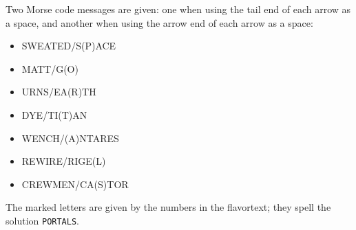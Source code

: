 Two Morse code messages are given: one when using the tail end of each
arrow as a space, and another when using the arrow end of each arrow
as a space:

\begin{itemize}
\item SWEATED/S(P)ACE
\item MATT/G(O)
\item URNS/EA(R)TH
\item DYE/TI(T)AN
\item WENCH/(A)NTARES
\item REWIRE/RIGE(L)
\item CREWMEN/CA(S)TOR  
\end{itemize}

The marked letters are given by the numbers in the flavortext;
they spell the solution \texttt{PORTALS}.
